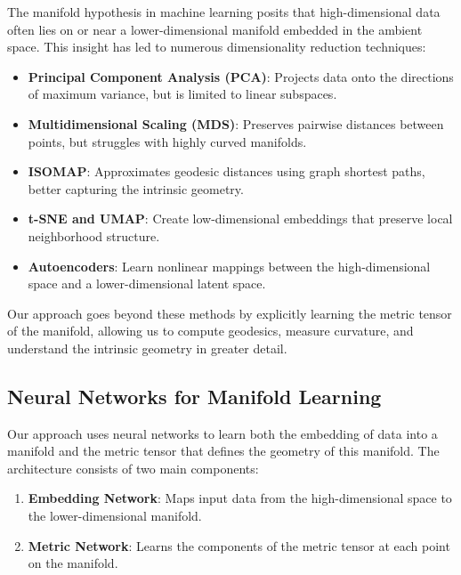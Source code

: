 \documentclass[11pt,a4paper]{article}
\begin{document}
The manifold hypothesis in machine learning posits that high-dimensional data often lies on or near a lower-dimensional manifold embedded in the ambient space. This insight has led to numerous dimensionality reduction techniques:

\begin{itemize}
    \item \textbf{Principal Component Analysis (PCA)}: Projects data onto the directions of maximum variance, but is limited to linear subspaces.
    
    \item \textbf{Multidimensional Scaling (MDS)}: Preserves pairwise distances between points, but struggles with highly curved manifolds.
    
    \item \textbf{ISOMAP}: Approximates geodesic distances using graph shortest paths, better capturing the intrinsic geometry.
    
    \item \textbf{t-SNE and UMAP}: Create low-dimensional embeddings that preserve local neighborhood structure.
    
    \item \textbf{Autoencoders}: Learn nonlinear mappings between the high-dimensional space and a lower-dimensional latent space.
\end{itemize}

Our approach goes beyond these methods by explicitly learning the metric tensor of the manifold, allowing us to compute geodesics, measure curvature, and understand the intrinsic geometry in greater detail.

\subsection{Neural Networks for Manifold Learning}

Our approach uses neural networks to learn both the embedding of data into a manifold and the metric tensor that defines the geometry of this manifold. The architecture consists of two main components:

\begin{enumerate}
    \item \textbf{Embedding Network}: Maps input data from the high-dimensional space to the lower-dimensional manifold.
    \item \textbf{Metric Network}: Learns the components of the metric tensor at each point on the manifold.
\end{enumerate}
\end{document}

